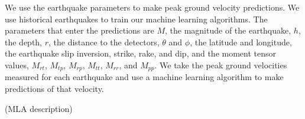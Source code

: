 \documentclass[preprint, aps, showpacs]{revtex4-1}
\newcommand{\rednote}[1]{{\color{red} (#1)}}
\begin{document}
We use the earthquake parameters to make peak ground velocity predictions. We use historical earthquakes to train our machine learning algorithms. The parameters that enter the predictions are $M$, the magnitude of the earthquake, $h$, the depth, $r$, the distance to the detectors, $\theta$ and $\phi$, the latitude and longitude, the earthquake slip inversion, strike, rake, and dip, and the moment tensor values, $M_{rt}$, $M_{tp}$, $M_{rp}$, $M_{tt}$, $M_{rr}$, and $M_{pp}$.
We take the peak ground velocities measured for each earthquake and use a machine learning algorithm to make predictions of that velocity.

\rednote{MLA description}
\end{document}
